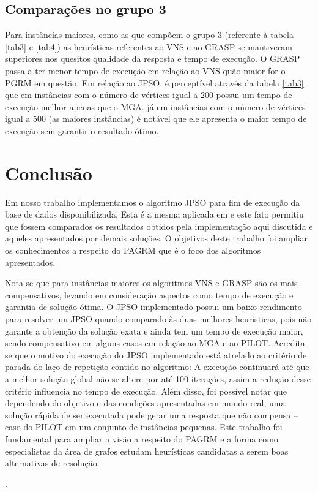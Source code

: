 \documentclass{sig-alternate-05-2015}
\begin{document}
\subsection{Comparações no grupo 3}
Para instâncias maiores, como as que compõem o grupo 3 (referente à tabela \ref{tab3} e \ref{tab4}) as heurísticas referentes ao VNS e ao GRASP se mantiveram
superiores nos quesitos qualidade da resposta e tempo de execução. O GRASP passa a ter menor tempo de execução em relação ao VNS quão maior for o PGRM em
questão. Em relação ao JPSO, é perceptível através da tabela \ref{tab3} que em instâncias com o número de vértices igual a 200 possui um tempo de execução
melhor apenas que o MGA. já em instâncias com o número de vértices igual a 500 (as maiores instâncias) é notável que ele apresenta o maior tempo de execução
sem garantir o resultado ótimo.


\section{Conclusão} \label{sec6}
Em nosso trabalho implementamos o algoritmo JPSO para fim de execução da base de dados disponibilizada. Esta é a mesma aplicada em \cite{consoli2009greedy} e
este fato permitiu que fossem comparados os resultados obtidos pela implementação aqui discutida e aqueles apresentados por demais soluções. O objetivos deste
trabalho foi ampliar os conhecimentos a respeito do PAGRM que é o foco dos algoritmos apresentados.

Nota-se que para instâncias maiores os algoritmos VNS e GRASP são os mais compensativos, levando em consideração aspectos como tempo de execução e garantia
de solução ótima. O JPSO implementado possui um baixo rendimento para resolver um JPSO quando comparado às duas melhores heurísticas, pois não garante a obtenção
da solução exata e ainda tem um tempo de execução maior, sendo compensativo em alguns casos em relação ao MGA e ao PILOT.  Acredita-se que o motivo do execução
do JPSO implementado está atrelado ao critério de parada do laço de repetição contido no algoritmo: A execução continuará até que a melhor solução global
não se altere por até 100 iterações, assim a redução desse critério influencia no tempo de execução. Além disso, foi possível notar que dependendo do
objetivo e das condições apresentadas em mundo real, uma solução rápida de ser executada pode gerar uma resposta que não compensa -- caso do PILOT em um conjunto
de instâncias pequenas. Este trabalho foi fundamental para ampliar a visão a respeito do PAGRM e a forma como especialistas da área de grafos estudam heurísticas
candidatas a serem boas alternativas de resolução.

.

%

%
%
\end{document}
